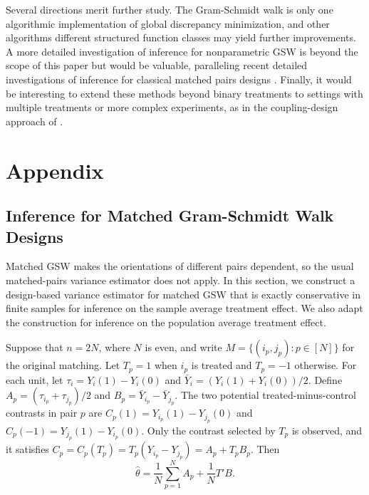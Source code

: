 \documentclass[letterpaper,12pt]{article}
\theoremstyle{definition}
\numberwithin{equation}{section}
\newcommand{\ylevel}{\bar Y}
\begin{document}
Several directions merit further study.
The Gram-Schmidt walk is only one algorithmic implementation of global discrepancy minimization, and other algorithms different structured function classes may yield further improvements.
A more detailed investigation of inference for nonparametric GSW is beyond the scope of this paper but would be valuable, paralleling recent detailed investigations of inference for classical matched pairs designs \citep{fogarty2018,bai2026graph}.
Finally, it would be interesting to extend these methods beyond binary treatments to settings with multiple treatments or more complex experiments, as in the coupling-design approach of \citet{cytrynbaum2026coupling}.





\appendix
\section{Appendix}

\subsection{Inference for Matched Gram-Schmidt Walk Designs}\label{appendix:matched-gsw-inference}

Matched GSW makes the orientations of different pairs dependent, so the usual matched-pairs variance estimator does not apply.
In this section, we construct a design-based variance estimator for matched GSW that is exactly conservative in finite samples for inference on the sample average treatment effect.
We also adapt the construction for inference on the population average treatment effect.

Suppose that $n=2N$, where $N$ is even, and write $M=\{(i_p,j_p):p\in[N]\}$ for the original matching.
Let $T_p=1$ when $i_p$ is treated and $T_p=-1$ otherwise.
For each unit, let $\tau_i=Y_i(1)-Y_i(0)$ and $\ylevel_i=(Y_i(1)+Y_i(0))/2$.
Define $A_p=(\tau_{i_p}+\tau_{j_p})/2$ and $B_p=\ylevel_{i_p}-\ylevel_{j_p}$.
The two potential treated-minus-control contrasts in pair $p$ are $C_p(1)=Y_{i_p}(1)-Y_{j_p}(0)$ and $C_p(-1)=Y_{j_p}(1)-Y_{i_p}(0)$.
Only the contrast selected by $T_p$ is observed, and it satisfies $C_p=C_p(T_p)=T_p(Y_{i_p}-Y_{j_p})=A_p+T_pB_p$.
Then
\begin{equation}\label{equation:matched-inference-estimator-decomposition}
\widehat\theta= \frac1N\sum_{p=1}^NA_p+\frac1NT'B.
\end{equation}
\end{document}
